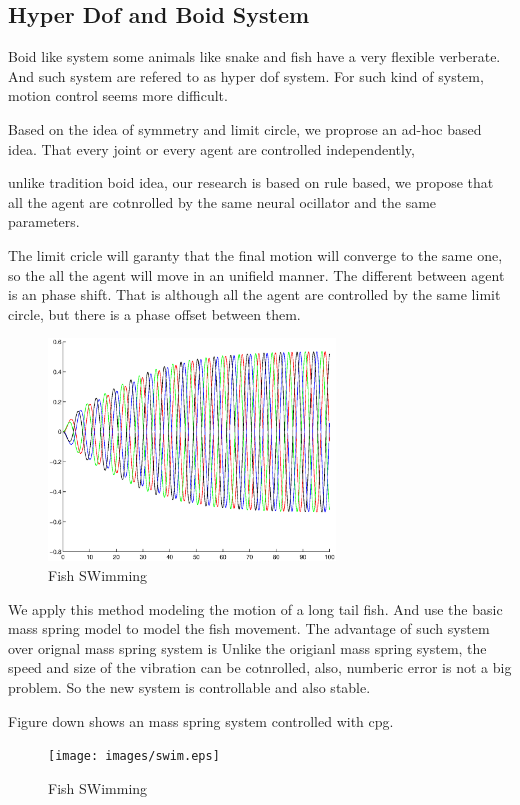 \subsection{Hyper Dof and Boid System}
Boid like system
some animals like snake and fish have a very flexible verberate. And such system are refered to as hyper dof system.
For such kind of system, motion control seems more difficult.

Based on the idea of symmetry and limit circle, we proprose an ad-hoc based idea.
That every joint or every agent are controlled independently,

unlike tradition boid idea,
our research is based on rule based,
 we propose that all the agent are cotnrolled by the same neural ocillator and the same parameters.

The limit cricle will garanty that the final motion will converge to the same one,
so the all the agent will move in an unifield manner.
The different between agent is an phase shift.
That is although all the agent are controlled by the same limit circle, but there is a phase offset between them.
\begin{figure}[ht]
  \centering
  \includegraphics[width=3in]{images/phaseShift.eps}
  \caption{Fish SWimming}
\end{figure}


We apply this method modeling the motion of a long tail fish.
And use the basic mass spring model to model the fish movement.
The advantage of such system over orignal mass spring system is 
Unlike the origianl mass spring system, the speed and size of the vibration can be cotnrolled,
also, numberic error is not a big problem.
So the new system is controllable and also stable.

Figure down shows an mass spring system controlled with cpg.
\begin{figure}[ht]
  \centering
  \texttt{[image: images/swim.eps]}
  \caption{Fish SWimming}
\end{figure}